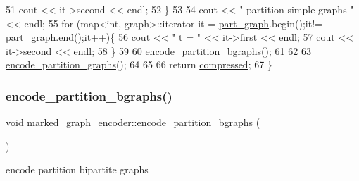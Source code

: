 \begin{DoxyCode}
51     cout << it->second << endl;
52   \}
53 
54   cout << \textcolor{stringliteral}{" partition simple graphs "} << endl;
55   \textcolor{keywordflow}{for} (map<int, graph>::iterator it = \hyperlink{classmarked__graph__encoder_adbafd0769ae301acc1b2c19b5e1d4844}{part\_graph}.begin();it!=
      \hyperlink{classmarked__graph__encoder_adbafd0769ae301acc1b2c19b5e1d4844}{part\_graph}.end();it++)\{
56     cout << \textcolor{stringliteral}{" t = "} << it->first << endl;
57     cout << it->second << endl;
58   \}
59 
60   \hyperlink{classmarked__graph__encoder_aa113c4870e3221faa332b2151b63d9e6}{encode\_partition\_bgraphs}();
61 
62 
63   \hyperlink{classmarked__graph__encoder_a654463d4b256b84225f5944b5e361ebf}{encode\_partition\_graphs}();
64 
65 
66   \textcolor{keywordflow}{return} \hyperlink{classmarked__graph__encoder_ac2ded200860fdd2321f86dd76b28bcb3}{compressed};
67 \}
\end{DoxyCode}
\mbox{\label{classmarked__graph__encoder_aa113c4870e3221faa332b2151b63d9e6}} 
\subsubsection{\texorpdfstring{encode\+\_\+partition\+\_\+bgraphs()}{encode\_partition\_bgraphs()}}
{\footnotesize\ttfamily void marked\+\_\+graph\+\_\+encoder\+::encode\+\_\+partition\+\_\+bgraphs (\begin{DoxyParamCaption}{ }\end{DoxyParamCaption})\hspace{0.3cm}{\ttfamily [private]}}



encode partition bipartite graphs 


